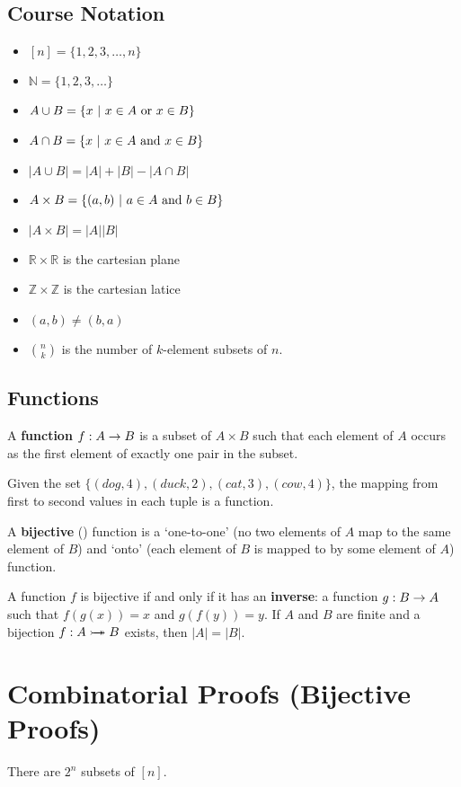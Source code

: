 \documentclass[12pt]{article}
\begin{document}
\subsection{Course Notation}
\begin{itemize}
\item $[n] = \{1, 2, 3, \dots, n\}$
\item $\mathbb{N} = \{1, 2, 3, \dots \}$
\item $A \cup B = \{ x \ |\  x \in A \text{ or } x \in B\}$
\item $A \cap B = \{ x \ |\  x \in A \text{ and } x \in B \}$
\item $|A \cup B| = |A| + |B| - |A \cap B|$
\item $A \times B = \{ (a,b) \ |\  a \in A \text{ and } b \in B \}$
\item $|A \times B| = |A| |B|$
\item $\mathbb{R} \times \mathbb{R}$ is the cartesian plane
\item $\mathbb{Z} \times \mathbb{Z}$ is the cartesian latice
\item $(a,b) \neq (b,a)$
\item ${n \choose k}$ is the number of $k$-element subsets of $n$.
\end{itemize}

\subsection{Functions}
A {\bf function} $f: A \rightarrow B$ is a subset of $A \times B$ such that each element of $A$ occurs as the first element of exactly one pair in the subset.

Given the set $\{ (dog, 4), (duck, 2), (cat, 3), (cow, 4) \}$, the mapping from first to second values in each tuple is a function.

A {\bf bijective} (\bijective) function is a `one-to-one' (no two elements of $A$ map to the same element of $B$) and `onto' (each element of $B$ is mapped to by some element of $A$) function.

A function $f$ is bijective if and only if it has an {\bf inverse}: a function $g: B \rightarrow A$ such that $f(g(x)) = x$ and $g(f(y)) = y$. If $A$ and $B$ are finite and a bijection $f: A \rightarrowtail\!\!\!\!\!\twoheadrightarrow B$ exists, then $|A| = |B|$.

\section{Combinatorial Proofs (Bijective Proofs)}
\begin{lemma}
There are $2^n$ subsets of $[n]$.
\end{lemma}
\end{document}
